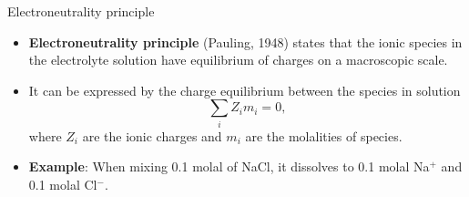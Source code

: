 %
%
%
\begin{frame}{Electroneutrality principle}

\begin{itemize}
\item \alert{\textbf{Electroneutrality principle}} (Pauling, 1948) states that 
the ionic species in the electrolyte solution have equilibrium of charges on a macroscopic scale.
\pause
\item It can be expressed by the charge equilibrium between the species in solution
%
\[
\boxed {\sum_i Z_i m_i = 0,}
\]
%
where $Z_i$ are the ionic charges and 
$m_i$ are the molalities of species.
%
\pause 
\item \alert{\bf Example}: 
When mixing 0.1 molal of NaCl, it dissolves to 0.1 molal Na$^+$ and 0.1 molal Cl$^-$.

\end{itemize}
%
\end{frame}
%
%
